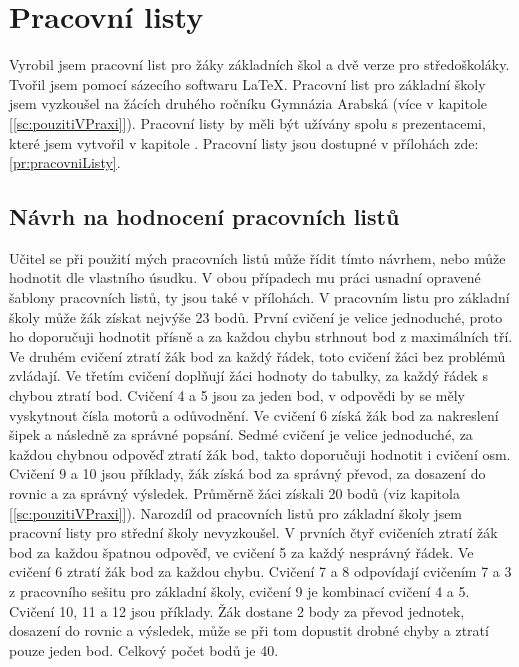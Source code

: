 \section{Pracovní listy}
{Vyrobil jsem pracovní list pro žáky základních škol a dvě verze pro středoškoláky. Tvořil jsem pomocí sázecího softwaru \LaTeX. Pracovní list pro základní školy jsem vyzkoušel na žácích druhého ročníku Gymnázia Arabská (více v kapitole  [\ref{sc:pouzitiVPraxi}]). Pracovní listy by měli být užívány spolu s prezentacemi, které jsem vytvořil v kapitole .}\odst
{Pracovní listy jsou dostupné v přílohách zde: \ref{pr:pracovniListy}.}
\subsection{Návrh na hodnocení pracovních listů}
{Učitel se při použití mých pracovních listů může řídit tímto návrhem, nebo může hodnotit dle vlastního úsudku. V obou případech mu práci usnadní opravené šablony pracovních listů, ty jsou také v přílohách.}\odst
{V pracovním listu pro základní školy může žák získat nejvýše 23 bodů. První cvičení je velice jednoduché, proto ho doporučuji hodnotit přísně a za každou chybu strhnout bod z maximálních tří. Ve druhém cvičení ztratí žák bod za každý řádek, toto cvičení žáci bez problémů zvládají. Ve třetím cvičení doplňují žáci hodnoty do tabulky, za každý řádek s chybou ztratí bod. Cvičení 4 a 5 jsou za jeden bod, v odpovědi by se měly vyskytnout čísla motorů a odůvodnění. Ve cvičení 6 získá žák bod za nakreslení šipek a následně za správné popsání. Sedmé cvičení je velice jednoduché, za každou chybnou odpověď ztratí žák bod, takto doporučuji hodnotit i cvičení osm. Cvičení 9 a 10 jsou příklady, žák získá bod za správný převod, za dosazení do rovnic a za správný výsledek. Průměrně žáci získali 20 bodů (viz kapitola  [\ref{sc:pouzitiVPraxi}]).}\odst
{Narozdíl od pracovních listů pro základní školy jsem pracovní listy pro střední školy nevyzkoušel. V prvních čtyř cvičeních ztratí žák bod za každou špatnou odpověď, ve cvičení 5 za každý nesprávný řádek. Ve cvičení 6 ztratí žák bod za každou chybu. Cvičení 7 a 8 odpovídají cvičením 7 a 3 z pracovního sešitu pro základní školy, cvičení 9 je kombinací cvičení 4 a 5. Cvičení 10, 11 a 12 jsou příklady. Žák dostane 2 body za převod jednotek, dosazení do rovnic a výsledek, může se při tom dopustit drobné chyby a ztratí pouze jeden bod. Celkový počet bodů je 40.}